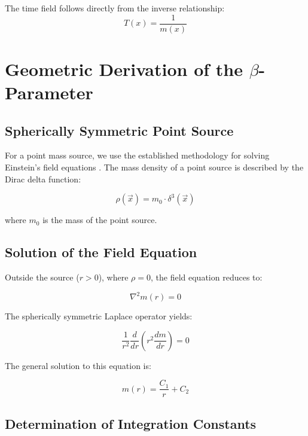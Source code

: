 	The time field follows directly from the inverse relationship:
	\begin{equation}
		\label{eq:time_field_definition}
		T(x) = \frac{1}{m(x)}
	\end{equation}
	
	\section{Geometric Derivation of the $\beta$-Parameter}
	\label{sec:beta_derivation}
	
	\subsection{Spherically Symmetric Point Source}
	\label{subsec:spherical_solution}
	
	For a point mass source, we use the established methodology for solving Einstein's field equations \citep{schwarzschild1916,misner1973}. The mass density of a point source is described by the Dirac delta function:
	
	\begin{equation}
		\rho(\vec{x}) = m_0 \cdot \delta^3(\vec{x})
	\end{equation}
	
	where $m_0$ is the mass of the point source.
	
	\subsection{Solution of the Field Equation}
	\label{subsec:field_solution}
	
	Outside the source ($r > 0$), where $\rho = 0$, the field equation reduces to:
	
	\begin{equation}
		\nabla^2 m(r) = 0
	\end{equation}
	
	The spherically symmetric Laplace operator \citep{jackson1998,griffiths1999} yields:
	
	\begin{equation}
		\frac{1}{r^2}\frac{d}{dr}\left(r^2 \frac{dm}{dr}\right) = 0
	\end{equation}
	
	The general solution to this equation is:
	
	\begin{equation}
		m(r) = \frac{C_1}{r} + C_2
	\end{equation}
	
	\subsection{Determination of Integration Constants}
	\label{subsec:integration_constants}
	

